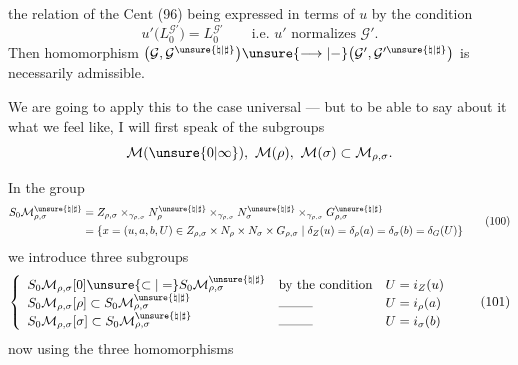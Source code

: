 
the relation of the $\mathrm{Cent}$ (96) being expressed in terms of $u$ by the condition
\[
u'\bigl(L_0^{\mathcal{G}'}\bigr)
=L_0^{\mathcal{G}'}
\qquad\text{i.e. }u'\text{ normalizes }\mathcal{G}'.
\tag{99}
\]
Then  \inserted{$(\rho,\sigma)$-}homomorphism
$\bigl(\mathcal{G},\mathcal{G}^{\unsure{\natural|\sharp}}\bigr)
\unsure{\longrightarrow|-}
\bigl(\mathcal{G}',\mathcal{G}^{\prime\unsure{\natural|\sharp}}\bigr)$
is necessarily admissible.

We are going to apply this to the case  universal --- but to be able to say about it  what we feel like, I will first speak of the subgroups
\[
\mathcal{M}(\unsure{0|\infty}),\ \mathcal{M}(\rho),\ \mathcal{M}(\sigma)\subset\mathcal{M}_{\rho,\sigma}.
\]





In the group 
\[
\begin{aligned}
S_0\mathcal{M}_{\rho,\sigma}^{\unsure{\natural|\sharp}}
&=Z_{\rho,\sigma}\times_{\gamma_{\rho,\sigma}}
N_\rho^{\unsure{\natural|\sharp}}\times_{\gamma_{\rho,\sigma}}
N_\sigma^{\unsure{\natural|\sharp}}\times_{\gamma_{\rho,\sigma}}
G_{\rho,\sigma}^{\unsure{\natural|\sharp}}\\
&=\left\{x=(u,a,b,U)\in Z_{\rho,\sigma}\times N_\rho\times N_\sigma\times G_{\rho,\sigma}
\;\middle|\;\delta_Z(u)=\delta_\rho(a)=\delta_\sigma(b)=\delta_G(U)\right\}
\end{aligned}
\tag{100}
\]
we introduce three subgroups
\[
\left\{
\begin{array}{lll}
S_0\mathcal{M}_{\rho,\sigma}[0]\unsure{\subset|=}S_0\mathcal{M}_{\rho,\sigma}^{\unsure{\natural|\sharp}}
&\text{by the condition}& U=i_Z(u)\\
S_0\mathcal{M}_{\rho,\sigma}[\rho]\subset S_0\mathcal{M}_{\rho,\sigma}^{\unsure{\natural|\sharp}}
&\text{\rule{2.6em}{0.3pt}}& U=i_\rho(a)\\
S_0\mathcal{M}_{\rho,\sigma}[\sigma]\subset S_0\mathcal{M}_{\rho,\sigma}^{\unsure{\natural|\sharp}}
&\text{\rule{2.6em}{0.3pt}}& U=i_\sigma(b)
\end{array}\right.
\tag{101}
\]
now using the three  homomorphisms

